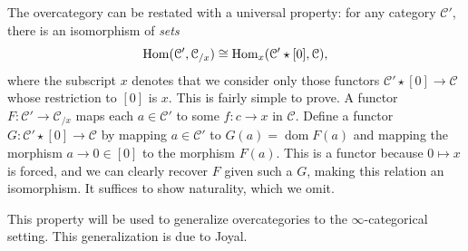 The overcategory can be restated with a universal property: for any category $\mathcal{C} '$, there is an isomorphism of \emph{sets}
\[
	\operatorname{Hom}(\mathcal{C} ', \mathcal{C} _{/x} ) \cong \operatorname{Hom}_x(\mathcal{C} '\star [0], \mathcal{C} ) ,
\]
where the subscript $x$ denotes that we consider only those functors $\mathcal{C} '\star [0]\to \mathcal{C} $ whose restriction to $[0]$ is $x$. This is fairly simple to prove. A functor $F : \mathcal{C} '\to \mathcal{C} _{/x} $ maps each $a\in \mathcal{C} '$ to some $f : c \to x$ in $\mathcal{C} $. Define a functor $G : \mathcal{C} '\star [0] \to \mathcal{C} $ by mapping $a\in \mathcal{C} '$ to $G(a)=\operatorname{dom} F(a)$ and mapping the morphism $a\to 0\in[0]$ to the morphism $F(a)$. This is a functor because $0\mapsto x$ is forced, and we can clearly recover $F$ given such a $G$, making this relation an isomorphism. It suffices to show naturality, which we omit.

This property will be used to generalize overcategories to the $\infty $-categorical setting. This generalization is due to Joyal.


